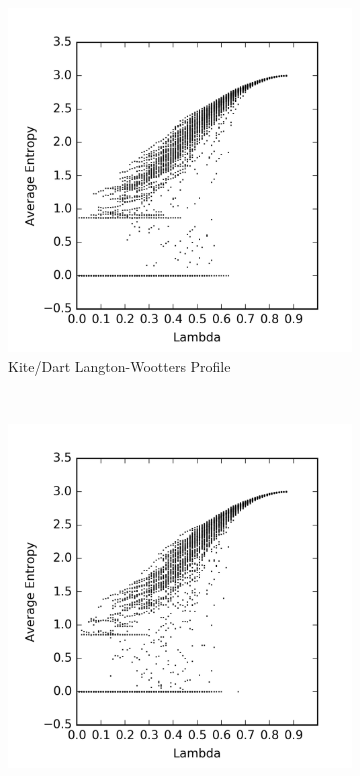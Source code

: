 \documentclass[a4paper,11pt,twoside]{report}
\begin{document}
\begin{figure}[htp]
\centering
\begin{subfigure}[t]{0.6\textwidth}
  \includegraphics[width=\textwidth]{ch6_figs/ckd_entropy_scatter}
  \caption{Kite/Dart Langton-Wootters Profile}
  \label{fig:ckd_lw_profile}
\end{subfigure}
~
\begin{subfigure}[t]{0.6\textwidth}
  \centering
  \includegraphics[width=\textwidth]{ch6_figs/crh_entropy_scatter}

\end{subfigure}
\end{figure}
\end{document}
